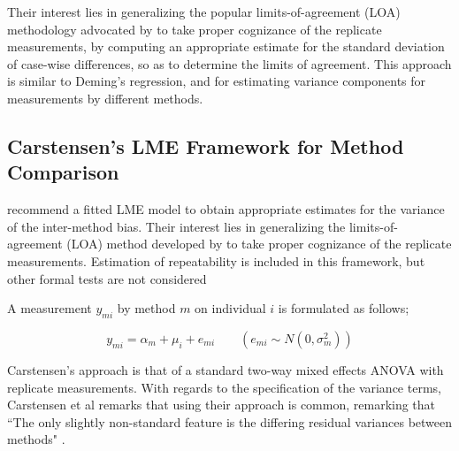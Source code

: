 \documentclass[12pt, a4paper]{report}
\theoremstyle{plain}
\theoremstyle{definition}
\theoremstyle{remark}
\begin{document}
%




Their interest lies in generalizing the popular limits-of-agreement (LOA) methodology advocated by \citet{BA86} to take proper cognizance of the replicate measurements, by computing an appropriate estimate for the standard deviation of case-wise differences, so as to determine the limits of agreement.  This approach is similar to Deming's regression, and for estimating variance components for measurements by different methods. 







\subsection{Carstensen's LME Framework for Method Comparison}



%
\citet{BXC2008} recommend a fitted LME model to obtain appropriate estimates for the variance of the inter-method bias. Their interest lies in generalizing the limits-of-agreement (LOA) method developed by \citet{BA86} to take proper cognizance of the replicate measurements.  Estimation of repeatability is included in this framework, but other formal tests are not considered

A measurement $y_{mi}$ by method $m$ on individual $i$ is
formulated as follows;

\begin{equation}
y_{mi}  = \alpha_{m} + \mu_{i} + e_{mi} \qquad ( e_{mi} \sim
N(0,\sigma^{2}_{m}))
\end{equation}

Carstensen's approach is that of a standard two-way mixed effects ANOVA with replicate measurements. With regards to the specification of the variance terms, Carstensen et al remarks that using their approach is common, remarking that ``The only slightly non-standard feature is the differing residual variances between methods" \citep{BXC2010}.
\end{document}
